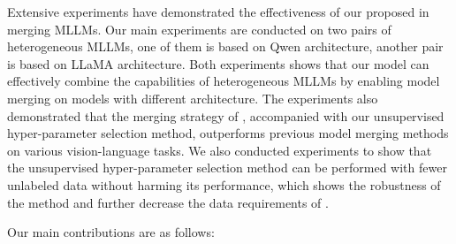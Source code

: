 Extensive experiments have demonstrated the effectiveness of our proposed \ours in merging MLLMs. Our main experiments are conducted on two pairs of heterogeneous MLLMs, one of them is based on Qwen \cite{qwen2} architecture, another pair is based on LLaMA \cite{llama} architecture. Both experiments shows that our model can effectively combine the capabilities of heterogeneous MLLMs by enabling model merging on models with different architecture. The experiments also demonstrated that the merging strategy of \ours, accompanied with our unsupervised hyper-parameter selection method, outperforms previous model merging methods on various vision-language tasks. We also conducted experiments to show that the unsupervised hyper-parameter selection method can be performed with fewer unlabeled data without harming its performance, which shows the robustness of the method and further decrease the data requirements of \ours.


Our main contributions are as follows:

